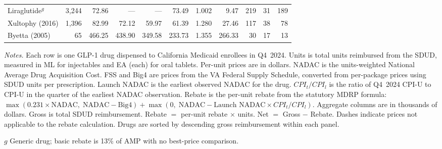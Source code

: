 \begin{landscape}
\begin{table}[!htbp]
\begin{threeparttable}
\begin{tabular}{@{} l r r r r r r r r r r @{}}
Liraglutide$^{g}$ & 3,244 & 72.86 & --- & --- & 73.49 & 1.002 & 9.47 & 219 & 31 & 189 \\
Xultophy (2016) & 1,396 & 82.99 & 72.12 & 59.97 & 61.39 & 1.280 & 27.46 & 117 & 38 & 78 \\
Byetta (2005) & 65 & 466.25 & 438.90 & 349.58 & 233.73 & 1.355 & 266.33 & 30 & 17 & 13 \\
\bottomrule
\end{tabular}
\begin{tablenotes}[flushleft]
\scriptsize
\item \emph{Notes.} Each row is one GLP-1 drug dispensed to California Medicaid enrollees in Q4~2024. Units is total units reimbursed from the SDUD, measured in ML for injectables and EA (each) for oral tablets. Per-unit prices are in dollars. NADAC is the units-weighted National Average Drug Acquisition Cost. FSS and Big4 are prices from the VA Federal Supply Schedule, converted from per-package prices using SDUD units per prescription. Launch NADAC is the earliest observed NADAC for the drug. $CPI_t/CPI_l$ is the ratio of Q4~2024 CPI-U to CPI-U in the quarter of the earliest NADAC observation. Rebate is the per-unit rebate from the statutory MDRP formula: $\max(0.231 \times \text{NADAC},\; \text{NADAC} - \text{Big4}) + \max(0,\; \text{NADAC} - \text{Launch NADAC} \times CPI_t/CPI_l)$. Aggregate columns are in thousands of dollars. Gross is total SDUD reimbursement. Rebate $=$ per-unit rebate $\times$ units. Net $=$ Gross $-$ Rebate. Dashes indicate prices not applicable to the rebate calculation. Drugs are sorted by descending gross reimbursement within each panel.
\item[$g$] Generic drug; basic rebate is 13\% of AMP with no best-price comparison.
\end{tablenotes}
\end{threeparttable}
\end{table}
\end{landscape}
